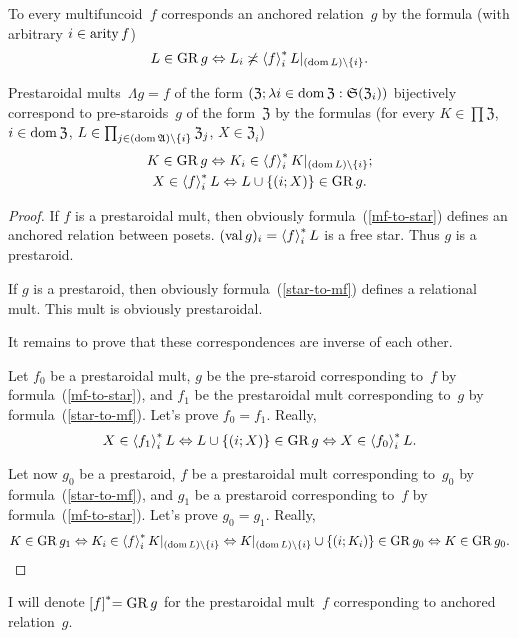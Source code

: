 \begin{defn}
To every multifuncoid~$f$ corresponds an anchored relation~$g$ by the
formula (with arbitrary $i\in\operatorname{arity} f$) 
\[
L\in\operatorname{GR} g\Leftrightarrow L_{i}\not\asymp\left\langle f\right\rangle ^{\ast}_{i}L|_{(\operatorname{dom} L)\setminus\{i\}}.
\]
\end{defn}
\begin{prop}
Prestaroidal mults~$\Lambda g=f$ of the form $(\mathfrak{Z};\lambda i\in\operatorname{dom}\mathfrak{Z}:\mathfrak{S}(\mathfrak{Z}_{i}))$
bijectively correspond to pre-staroids~$g$ of the form~$\mathfrak{Z}$
by the formulas (for every $K\in\prod\mathfrak{Z}$, $i\in\operatorname{dom}\mathfrak{Z}$,
$L\in\prod_{j\in(\operatorname{dom}\mathfrak{A})\setminus\{i\}}\mathfrak{Z}_{j}$,
$X\in\mathfrak{Z}_{i}$)
\begin{gather}
K\in\operatorname{GR} g\Leftrightarrow K_{i}\in\left\langle f\right\rangle ^{\ast}_{i}K|_{(\operatorname{dom} L)\setminus\{i\}};\label{mf-to-star}\\
X\in\left\langle f\right\rangle ^{\ast}_{i}L\Leftrightarrow L\cup\{(i;X)\}\in\operatorname{GR} g.\label{star-to-mf}
\end{gather}
\end{prop}
\begin{proof}
If $f$ is a prestaroidal mult, then obviously formula~(\ref{mf-to-star})
defines an anchored relation between posets. $(\operatorname{val} g)_{i}=\left\langle f\right\rangle ^{\ast}_{i}L$
is a free star. Thus $g$ is a prestaroid.

If $g$ is a prestaroid, then obviously formula~(\ref{star-to-mf})
defines a relational mult. This mult is obviously prestaroidal.

It remains to prove that these correspondences are inverse of each
other.

Let $f_{0}$ be a prestaroidal mult, $g$ be the pre-staroid corresponding
to~$f$ by formula~(\ref{mf-to-star}), and $f_{1}$ be the prestaroidal
mult corresponding to~$g$ by formula~(\ref{star-to-mf}). Let's
prove $f_{0}=f_{1}$. Really, 
\[
X\in\left\langle f_{1}\right\rangle ^{\ast}_{i}L\Leftrightarrow L\cup\{(i;X)\}\in\operatorname{GR} g\Leftrightarrow X\in\left\langle f_{0}\right\rangle ^{\ast}_{i}L.
\]


Let now $g_{0}$ be a prestaroid, $f$ be a prestaroidal mult corresponding
to~$g_{0}$ by formula~(\ref{star-to-mf}), and $g_{1}$ be a prestaroid
corresponding to~$f$ by formula~(\ref{mf-to-star}). Let's prove
$g_{0}=g_{1}$. Really, 
\[
K\in\operatorname{GR} g_{1}\Leftrightarrow K_{i}\in\left\langle f\right\rangle ^{\ast}_{i}K|_{(\operatorname{dom} L)\setminus\{i\}}\Leftrightarrow K|_{(\operatorname{dom} L)\setminus\{i\}}\cup\{(i;K_{i})\}\in\operatorname{GR} g_{0}\Leftrightarrow K\in\operatorname{GR} g_{0}.
\]
\end{proof}
\begin{defn}
I will denote $\mathrel{\left[f\right]^{\ast}}=\operatorname{GR} g$ for the prestaroidal mult~$f$ corresponding to anchored relation~$g$.
\end{defn}


